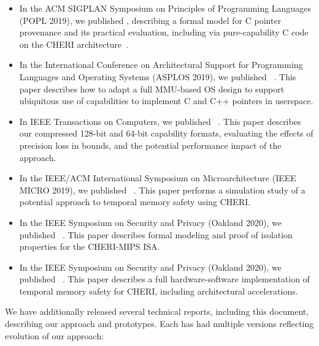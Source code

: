 \begin{itemize}
\item In the ACM SIGPLAN Symposium on Principles of Programming Languages
  (POPL 2019), we published , describing a
  formal model for C pointer provenance and its
  practical evaluation, including via pure-capability C code on the CHERI
  architecture~\cite{cerberus-popl2019}.

\item In the International Conference on Architectural Support for
  Programming Languages and Operating Systems (ASPLOS 2019), we published
  ~\cite{davis2019:cheriabi}.
  This paper describes how to adapt a full MMU-based OS design to support
  ubiquitous use of capabilities to implement C and C++ pointers in userspace.

\item In IEEE Transactions on Computers, we published ~\cite{Woodruff2019}.
  This paper describes our compressed 128-bit and 64-bit capability formats,
  evaluating the effects of precision loss in bounds, and the potential
  performance impact of the approach.

\item In the IEEE/ACM International Symposium on Microarchitecture (IEEE
  MICRO 2019), we published ~\cite{Xia_CHERIvokeCharacterisingPointer_2019}.
  This paper performs a simulation study of a potential approach to temporal
  memory safety using CHERI.

\item In the IEEE Symposium on Security and Privacy (Oakland 2020), we
  published ~\cite{cheri-formal-SP2020}.
  This paper describes formal modeling and proof of isolation properties for
  the CHERI-MIPS ISA.

\item In the IEEE Symposium on Security and Privacy (Oakland 2020), we
  published ~\cite{cornucopia}.
  This paper describes a full hardware-software implementation of temporal
  memory safety for CHERI, including architectural accelerations.
\end{itemize}

We have additionally released several technical reports, including this
document, describing our approach and prototypes.
Each has had multiple versions reflecting evolution of our approach:


